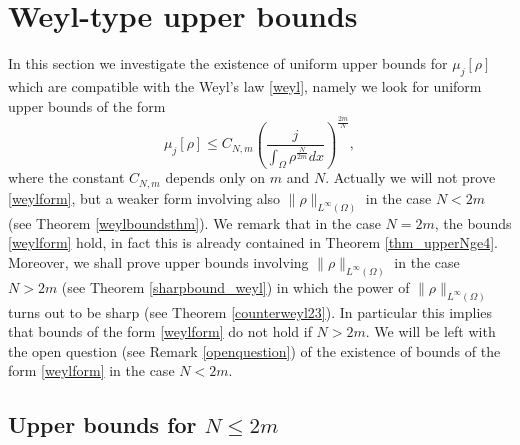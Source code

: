 \documentclass[11pt,a4paper]{amsart}
\numberwithin{equation}{section}
\begin{document}
\section{Weyl-type upper bounds}\label{WE}
In this section we investigate the existence of uniform upper bounds for $\mu_j[\rho]$ which are compatible with the Weyl's law \eqref{weyl}, namely we look for uniform upper bounds of the form
\begin{equation}\label{weylform}
\mu_j[\rho]\leq C_{N,m}\left(\frac{j}{\int_{\Omega}\rho^{\frac{N}{2m}}dx}\right)^{\frac{2m}{N}},
\end{equation}
where the constant $C_{N,m}$ depends only on $m$ and $N$. Actually we will not prove \eqref{weylform}, but a weaker form involving also $\|\rho\|_{L^{\infty}(\Omega)}$ in the case $N<2m$ (see Theorem \ref{weylboundsthm}). We remark that in the case $N=2m$, the bounds \eqref{weylform} hold, in fact this is already contained in Theorem \ref{thm_upperNge4}. Moreover, we shall prove upper bounds involving $\|\rho\|_{L^{\infty}(\Omega)}$ in the case $N>2m$ (see Theorem \ref{sharpbound_weyl}) in which the power of $\|\rho\|_{L^{\infty}(\Omega)}$ turns out to be sharp (see Theorem \ref{counterweyl23}). In particular this implies that bounds of the form \eqref{weylform} do not hold if $N>2m$. We will be left with the open question (see Remark \ref{openquestion}) of the existence of bounds of the form \eqref{weylform} in the case $N<2m$.






\subsection{Upper bounds for \texorpdfstring{$N\leq 2m$}{N<=2m}}\label{sec:41}
\end{document}
